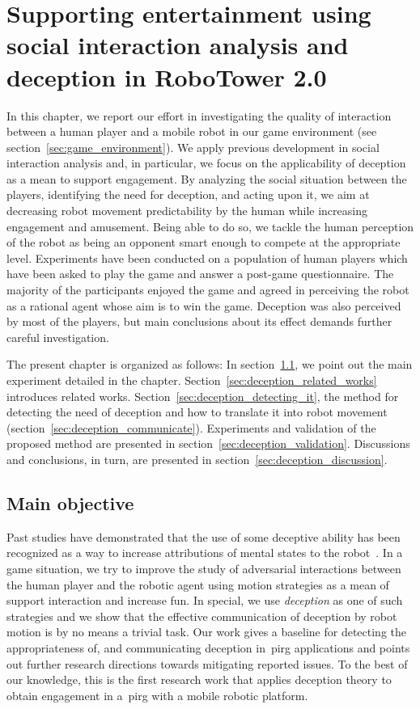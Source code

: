 \chapter{Supporting entertainment using social interaction analysis and deception in RoboTower 2.0}\label{ch:deception}

In this chapter, we report our effort in investigating the quality of interaction between a human player and a mobile robot in our game environment (see section~\ref{sec:game_environment}). We apply previous development in social interaction analysis and, in particular, we focus on the applicability of deception as a mean to support engagement. By analyzing the social situation between the players, identifying the need for deception, and acting upon it, we aim at decreasing robot movement predictability by the human while increasing engagement and amusement. Being able to do so, we tackle the human perception of the robot as being an opponent smart enough to compete at the appropriate level. Experiments have been conducted on a population of human players which have been asked to play the game and answer a post-game questionnaire. The majority of the participants enjoyed the game and agreed in perceiving the robot as a rational agent whose aim is to win the game. Deception was also perceived by most of the players, but main conclusions about its effect demands further careful investigation.

The present chapter is organized as follows: In section~\ref{sec:deception_main_objectives}, we point out the main experiment detailed in the chapter. Section~\ref{sec:deception_related_works} introduces related works. Section~\ref{sec:deception_detecting_it}, the method for detecting the need of deception and how to translate it into robot movement (section~\ref{sec:deception_communicate}). Experiments and validation of the proposed method are presented in section~\ref{sec:deception_validation}. Discussions and conclusions, in turn, are presented in section~\ref{sec:deception_discussion}.

\section{Main objective}\label{sec:deception_main_objectives}

Past studies have demonstrated that the use of some deceptive ability has been recognized as a way to increase attributions of mental states to the robot~\citep{shim_taxonomy_2013}. In a game situation, we try to improve the study of adversarial interactions between the human player and the robotic agent using motion strategies as a mean of support interaction and increase fun. In special, we use \textit{deception} as one of such strategies and we show that the effective communication of deception by robot motion is by no means a trivial task. Our work gives a baseline for detecting the appropriateness of, and communicating deception in~\gls{pirg} applications and points out further research directions towards mitigating reported issues. To the best of our knowledge, this is the first research work that applies deception theory to obtain engagement in a~\gls{pirg} with a mobile robotic platform.

